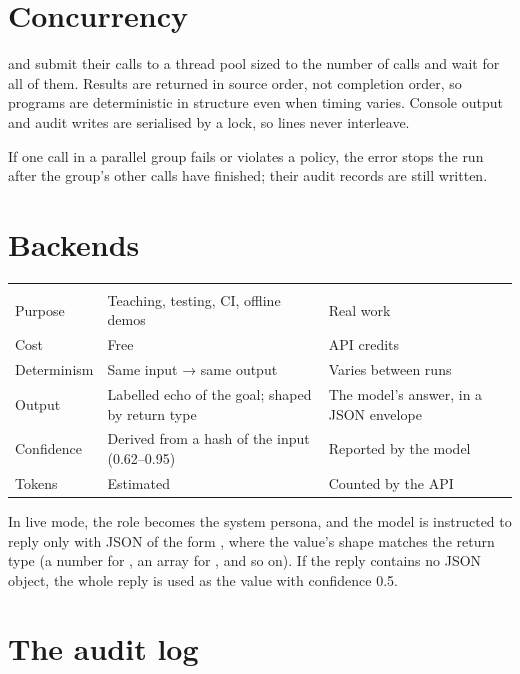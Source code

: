 \section{Concurrency}

 and  submit their calls to a thread pool sized to the number of calls and wait for all of them. Results are returned in source order, not completion order, so programs are deterministic in structure even when timing varies. Console output and audit writes are serialised by a lock, so lines never interleave.

\begin{note}
If one call in a parallel group fails or violates a policy, the error stops the run after the group's other calls have finished; their audit records are still written.
\end{note}

\section{Backends}

\begin{center}
\small
\begin{tabularx}{\linewidth}{@{}L{2.2cm}YY@{}}
\toprule
\thead{} &  & \\
\goldrule
Purpose & Teaching, testing, CI, offline demos & Real work\\
Cost & Free & API credits\\
Determinism & Same input → same output & Varies between runs\\
Output & Labelled echo of the goal; shaped by return type & The model's answer, in a JSON envelope\\
Confidence & Derived from a hash of the input (0.62--0.95) & Reported by the model\\
Tokens & Estimated & Counted by the API\\
\bottomrule
\end{tabularx}
\end{center}

In live mode, the role becomes the system persona, and the model is instructed to reply only with JSON of the form , where the value's shape matches the return type (a number for , an array for , and so on). If the reply contains no JSON object, the whole reply is used as the value with confidence 0.5.

\section{The audit log}
\label{sec:audit}

